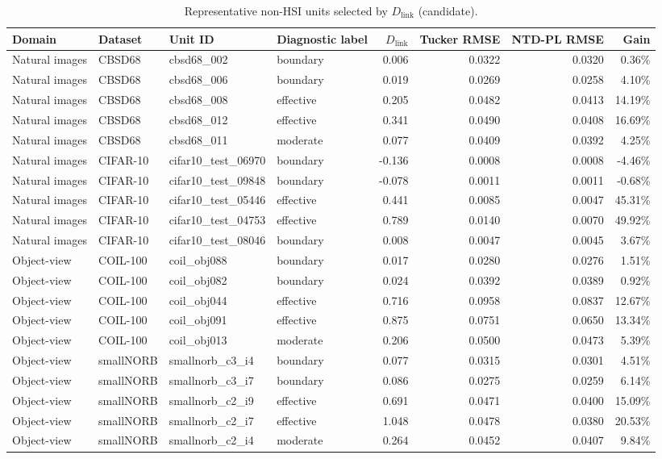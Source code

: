 \begin{table}[t]
\centering
\caption{Representative non-HSI units selected by $D_{\mathrm{link}}$ (candidate).}
\begin{tabular}{@{}l l l l r r r r@{}}
\toprule
Domain & Dataset & Unit ID & Diagnostic label & $D_{\mathrm{link}}$ & Tucker RMSE & NTD-PL RMSE & Gain \\
\midrule
Natural images & CBSD68 & cbsd68_002 & boundary & 0.006 & 0.0322 & 0.0320 & 0.36\% \\
Natural images & CBSD68 & cbsd68_006 & boundary & 0.019 & 0.0269 & 0.0258 & 4.10\% \\
Natural images & CBSD68 & cbsd68_008 & effective & 0.205 & 0.0482 & 0.0413 & 14.19\% \\
Natural images & CBSD68 & cbsd68_012 & effective & 0.341 & 0.0490 & 0.0408 & 16.69\% \\
Natural images & CBSD68 & cbsd68_011 & moderate & 0.077 & 0.0409 & 0.0392 & 4.25\% \\
Natural images & CIFAR-10 & cifar10_test_06970 & boundary & -0.136 & 0.0008 & 0.0008 & -4.46\% \\
Natural images & CIFAR-10 & cifar10_test_09848 & boundary & -0.078 & 0.0011 & 0.0011 & -0.68\% \\
Natural images & CIFAR-10 & cifar10_test_05446 & effective & 0.441 & 0.0085 & 0.0047 & 45.31\% \\
Natural images & CIFAR-10 & cifar10_test_04753 & effective & 0.789 & 0.0140 & 0.0070 & 49.92\% \\
Natural images & CIFAR-10 & cifar10_test_08046 & boundary & 0.008 & 0.0047 & 0.0045 & 3.67\% \\
Object-view & COIL-100 & coil_obj088 & boundary & 0.017 & 0.0280 & 0.0276 & 1.51\% \\
Object-view & COIL-100 & coil_obj082 & boundary & 0.024 & 0.0392 & 0.0389 & 0.92\% \\
Object-view & COIL-100 & coil_obj044 & effective & 0.716 & 0.0958 & 0.0837 & 12.67\% \\
Object-view & COIL-100 & coil_obj091 & effective & 0.875 & 0.0751 & 0.0650 & 13.34\% \\
Object-view & COIL-100 & coil_obj013 & moderate & 0.206 & 0.0500 & 0.0473 & 5.39\% \\
Object-view & smallNORB & smallnorb_c3_i4 & boundary & 0.077 & 0.0315 & 0.0301 & 4.51\% \\
Object-view & smallNORB & smallnorb_c3_i7 & boundary & 0.086 & 0.0275 & 0.0259 & 6.14\% \\
Object-view & smallNORB & smallnorb_c2_i9 & effective & 0.691 & 0.0471 & 0.0400 & 15.09\% \\
Object-view & smallNORB & smallnorb_c2_i7 & effective & 1.048 & 0.0478 & 0.0380 & 20.53\% \\
Object-view & smallNORB & smallnorb_c2_i4 & moderate & 0.264 & 0.0452 & 0.0407 & 9.84\% \\
\bottomrule
\end{tabular}
\end{table}
